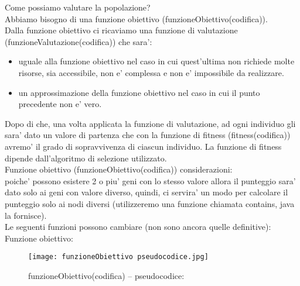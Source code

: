 \documentclass[10pt,a4paper]{article}
\begin{document}
      Come possiamo valutare la popolazione?\\
      Abbiamo bisogno di una funzione obiettivo (funzioneObiettivo(codifica)).\\
      Dalla funzione obiettivo ci ricaviamo una funzione di valutazione (funzioneValutazione(codifica)) che sara':
      \begin{itemize}
        \item uguale alla funzione obiettivo nel caso in cui quest'ultima non richiede molte risorse, 
        sia accessibile, non e' complessa e non e' impossibile da realizzare.
        \item un approssimazione della funzione obiettivo nel caso in cui il punto precedente non e' 
        vero. 
      \end{itemize}
      Dopo di che, una volta applicata la funzione di valutazione, ad ogni individuo gli sara' dato un valore di 
      partenza che con la funzione di fitness (fitness(codifica)) avremo' il grado di sopravvivenza di ciascun 
      individuo. La funzione di fitness dipende dall'algoritmo di selezione utilizzato.\\
      Funzione obiettivo (funzioneObiettivo(codifica)) considerazioni:\\
      poiche' possono esistere 2 o piu' geni con lo stesso valore allora il punteggio sara' dato solo ai 
      geni con valore diverso, quindi, ci servira' un modo per calcolare il punteggio solo ai nodi 
      diversi (utilizzeremo una funzione chiamata contains, java la fornisce).\\
      Le seguenti funzioni possono cambiare (non sono ancora quelle definitive):\\
      Funzione obiettivo:\\
      \begin{figure}[h!]
        \centering
        \caption{funzioneObiettivo(codifica) -- pseudocodice:}
        \texttt{[image: funzioneObiettivo pseudocodice.jpg]}
        \label{funzioneObiettivoPseudocodice}
      \end{figure}
      \\\\\\\\\\\\\\\\\\\\\\\\\\\\\\\\\\\\\\\\\\\\\\\\\\\\
      
\end{document}
